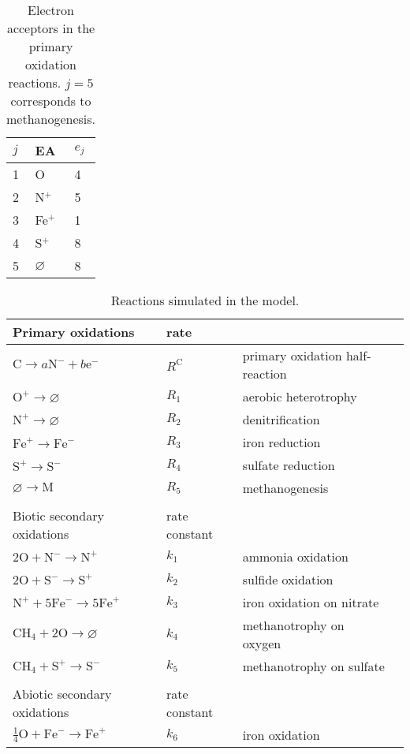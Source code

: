 \documentclass{report}
\newcommand{\m}[1]{ \mathrm{#1} }
\begin{document}
\begin{table}
\centering
\begin{tabular}{ l l l }
\toprule
$j$ &   EA   &   $e_j$   \\
\midrule
1   &   O   & 4  \\
2   &   N$^+$   & 5  \\
3   &   Fe$^+$  & 1  \\
4   &   S$^+$   & 8  \\
5   &   $\varnothing$   & 8  \\
\bottomrule
\end{tabular}
\caption{Electron acceptors in the primary oxidation reactions. $j=5$ corresponds to
methanogenesis.}
\label{tab:electron_acceptors}
\end{table}

\begin{table}
\begin{tabular}{ l l l l }
\toprule
Primary oxidations  & rate \\
\midrule
$\m{C} \rightarrow a \m{N}^- + b \m{e}^-$   & $R^\m{C}$ & primary oxidation half-reaction \\
$\m{O}^+ \to \varnothing$    &   $R_1$   & aerobic heterotrophy \\
$\m{N}^+ \to \varnothing$    &   $R_2$   & denitrification \\
$\m{Fe}^+ \to \m{Fe}^-$ & $R_3$ & iron reduction  \\
$\m{S}^+ \to \m{S}^-$ & $R_4$ & sulfate reduction  \\
$\varnothing \to \m{M}$ & $R_5$ & methanogenesis \\
\\
\midrule
Biotic secondary oxidations & rate constant \\
\midrule
$2 \m{O} + \m{N}^- \rightarrow \m{N}^+$  & $k_1$ & ammonia oxidation   \\
$2 \m{O} + \m{S}^- \rightarrow \m{S}^+$  & $k_2$ & sulfide oxidation   \\
$\m{N}^+ + 5 \m{Fe}^- \rightarrow 5 \m{Fe}^+$    &   $k_3$  & iron oxidation on nitrate  \\
$\m{CH}_4 + 2 \m{O} \rightarrow \varnothing$    &   $k_4$  & methanotrophy on oxygen  \\
$\m{CH}_4 + \m{S}^+ \rightarrow \m{S}^-$    &   $k_5$  & methanotrophy on sulfate  \\
\\
\midrule
Abiotic secondary oxidations    & rate constant \\
\midrule
$\tfrac{1}{4} \m{O} + \m{Fe}^- \rightarrow \m{Fe}^+$ & $k_6$ & iron oxidation  \\
\bottomrule
\end{tabular}
\label{tab:reactions}
\caption{Reactions simulated in the model.}
\end{table}
\end{document}
